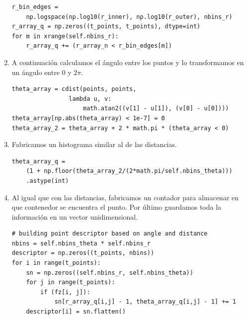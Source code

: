 \documentclass[size=a4, parskip=half, titlepage=false, toc=flat, toc=bib, 12pt]{scrartcl}
\begin{document}
\begin{enumerate}
\begin{verbatim}
r_bin_edges =
    np.logspace(np.log10(r_inner), np.log10(r_outer), nbins_r)
r_array_q = np.zeros((t_points, t_points), dtype=int)
for m in xrange(self.nbins_r):
    r_array_q += (r_array_n < r_bin_edges[m])
\end{verbatim}

\item A continuación calculamos el ángulo entre los puntos y lo transformamos en un ángulo entre 0 y $2\pi$.
\begin{verbatim}
theta_array = cdist(points, points,
                lambda u, v:
                    math.atan2((v[1] - u[1]), (v[0] - u[0])))
theta_array[np.abs(theta_array) < 1e-7] = 0
theta_array_2 = theta_array + 2 * math.pi * (theta_array < 0)
\end{verbatim}
\item Fabricamos un histograma similar al de las distancias.
\begin{verbatim}
theta_array_q =
    (1 + np.floor(theta_array_2/(2*math.pi/self.nbins_theta)))
    .astype(int)
\end{verbatim}
\item Al igual que con las distancias, fabricamos un contador para almacenar en que contenedor se encuentra el punto. Por último guardamos toda la información en un vector unidimensional.
\begin{verbatim}
# building point descriptor based on angle and distance
nbins = self.nbins_theta * self.nbins_r
descriptor = np.zeros((t_points, nbins))
for i in range(t_points):
    sn = np.zeros((self.nbins_r, self.nbins_theta))
    for j in range(t_points):
        if (fz[i, j]):
            sn[r_array_q[i,j] - 1, theta_array_q[i,j] - 1] += 1
    descriptor[i] = sn.flatten()
\end{verbatim}
\end{enumerate}

\end{document}
